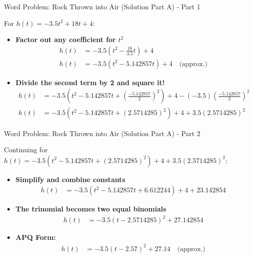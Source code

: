 \documentclass[aspectratio=169]{beamer}
\begin{document}
\begin{frame}{Word Problem: Rock Thrown into Air (Solution Part A) - Part 1}
    \begin{tcolorbox}[colback=lightgray,colframe=accent,title=Solution Part A: Convert to APQ Form - Part 1]
        \footnotesize
        For $h(t) = -3.5t^2 + 18t + 4$:
        \begin{itemize}
            \item \textbf{Factor out any coefficient for $t^2$}
                \begin{align*}
                    h(t) &= -3.5\left(t^2 - \frac{18}{3.5}t\right) + 4 \\
                    h(t) &= -3.5(t^2 - 5.142857t) + 4 \quad \text{(approx.)}
                \end{align*}
            \item \textbf{Divide the second term by 2 and square it!}
                \begin{align*}
                    h(t) &= -3.5\left(t^2 - 5.142857t + \left(\frac{-5.142857}{2}\right)^2\right) + 4 - (-3.5)\left(\frac{-5.142857}{2}\right)^2 \\
                    h(t) &= -3.5(t^2 - 5.142857t + (2.5714285)^2) + 4 + 3.5(2.5714285)^2
                \end{align*}
        \end{itemize}
    \end{tcolorbox}
\end{frame}

\begin{frame}{Word Problem: Rock Thrown into Air (Solution Part A) - Part 2}
    \begin{tcolorbox}[colback=lightgray,colframe=accent,title=Solution Part A: Convert to APQ Form - Part 2 (Cont.)]
        \footnotesize
        Continuing for $h(t) = -3.5(t^2 - 5.142857t + (2.5714285)^2) + 4 + 3.5(2.5714285)^2$:
        \begin{itemize}
            \item \textbf{Simplify and combine constants}
                \begin{align*}
                    h(t) &= -3.5(t^2 - 5.142857t + 6.612244) + 4 + 23.142854
                \end{align*}
            \item \textbf{The trinomial becomes two equal binomials}
                \begin{align*}
                    h(t) &= -3.5(t - 2.5714285)^2 + 27.142854
                \end{align*}
            \item \textbf{APQ Form:}
                \begin{align*}
                    h(t) &= -3.5(t - 2.57)^2 + 27.14 \quad \text{(approx.)}
                \end{align*}
        \end{itemize}
    \end{tcolorbox}
\end{frame}
\end{document}
